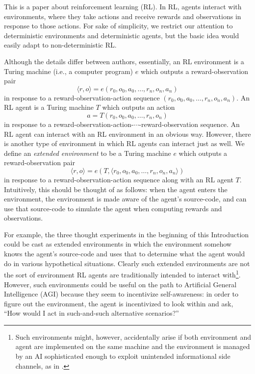 \documentclass[runningheads]{llncs}
\begin{document}
This is a paper about reinforcement learning (RL).
In RL, agents interact with environments, where they take actions and
receive rewards and observations in response to those actions.
For sake of simplicity, we restrict our attention
to deterministic environments and deterministic agents, but the basic idea
would easily adapt
to non-deterministic RL.

Although the details differ between authors, essentially,
an RL environment is a Turing machine (i.e., a computer program)
$e$ which outputs a reward-observation pair
\[
  \langle r,o\rangle=e(r_0,o_0,a_0,\ldots,r_n,o_n,a_n)
\]
in response to a
reward-observation-action sequence $(r_0,o_0,a_0,\ldots,r_n,o_n,a_n)$.
An RL agent is a Turing machine $T$ which outputs an action
\[
  a=T(r_0,o_0,a_0,\ldots,r_n,o_n)
\]
in response to a
reward-observation-action-$\cdots$-reward-observation sequence.
An RL agent can interact with an RL environment in an obvious way.
However, there is another type of environment in which
RL agents can interact just as well. We define an \emph{extended
environment} to be a Turing machine $e$ which outputs a reward-observation pair
\[
    \langle r,o\rangle=e(T,\langle r_0,o_0,a_0,\ldots,r_n,o_n,a_n \rangle)
\]
in response
to a reward-observation-action sequence
along with an RL agent $T$.
Intuitively, this should be thought of as follows: when the agent enters the environment,
the environment is made aware of the agent's source-code, and can use that
source-code to simulate the agent when computing rewards and observations.

For example, the three thought experiments in the beginning of this Introduction could
be cast as extended environments in which the environment somehow knows the agent's
source-code and uses that to determine what the agent would do in various
hypothetical situations.
Clearly such
extended environments are not the sort of environment RL agents are traditionally
intended to interact with\footnote{Such environments might, however,
accidentally arise if both environment
and agent are implemented on the same machine and the environment is managed by an AI
sophisticated enough to exploit unintended informational side channels, as in
\cite{yampolskiy2012leakproofing}.}. However, such environments could be
useful on the path to Artificial
General Intelligence (AGI) because they seem to incentivize self-awareness:
in order to figure out the environment, the agent is incentivized to look within
and ask, ``How would I act in such-and-such alternative scenarios?''
\end{document}
